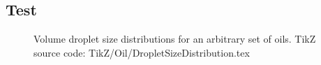 \clearpage
\subsection{Test}
%
\begin{figure}[hbt!]
    \centering
    
    \caption{Volume droplet size distributions for an arbitrary set of oils. TikZ source code: TikZ/Oil/DropletSizeDistribution.tex}
    \label{fig:DropletSizeDistribution}
\end{figure}%